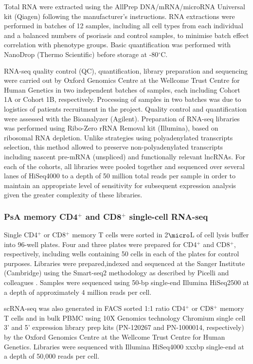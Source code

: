 Total RNA were extracted using the AllPrep DNA/mRNA/microRNA Universal kit (Qiagen) following the manufacturer's instructions. RNA extractions were performed in batches of 12 samples, including all cell types from each individual and a balanced numbers of psoriasis and control samples, to minimise batch effect correlation with phenotype groups. Basic quantification was performed with NanoDrop (Thermo Scientific) before storage at -80{$^\circ$}C.

RNA-seq quality control (QC), quantification, library preparation and sequencing were carried out by Oxford Genomics Centre at the Wellcome Trust Centre for Human Genetics in two independent batches of samples, each including Cohort 1A or Cohort 1B, respectively. Processing of samples in two batches was due to logistics of patients recruitment in the project. Quality control and quantification were assessed with the Bioanalyzer (Agilent). Preparation of RNA-seq libraries was performed using Ribo-Zero rRNA Removal kit (Illumina), based on ribosomal RNA depletion. Unlike strategies using polyadenylated transcripts selection, this method allowed to preserve non-polyadenylated transcripts including nascent pre-mRNA (unspliced) and functionally relevant lncRNAs. For each of the cohorts, all libraries were pooled together and  sequenced over several lanes of HiSeq4000 to a depth of 50 million total reads per sample in order to maintain an appropriate level of sensitivity for subsequent expression analysis given the greater complexity of these libraries.

 

\subsubsection{PsA memory CD4$^{+}$ and CD8$^{+}$ single-cell RNA-seq} 
\label{scRNA_processing}
Single CD4$^{+}$ or CD8$^{+}$ memory T cells were sorted in 2$\micro$L of cell lysis buffer into 96-well plates. Four and three plates were prepared for CD4$^{+}$ and CD8$^{+}$, respectively, including wells containing 50 cells in each of the plates for control purposes. Libraries were prepared,indexed and sequenced at the Sanger Institute (Cambridge) using the Smart-seq2 methodology as described by Picelli and colleagues \parencite{Picelli2014}. Samples were sequenced using 50-bp single-end Illumina HiSeq2500 at a depth of approximately 4 million reads per cell. %

scRNA-seq was also generated in FACS sorted 1:1 ratio CD4$^{+}$ or CD8$^{+}$ memory T cells and in bulk PBMC using 10X Genomics technology Chromium single cell 3' and 5' expression library prep kits (PN-120267 and PN-1000014, respectively) by the Oxford Genomics Centre at the Wellcome Trust Centre for Human Genetics. Libraries were sequenced with Illumina HiSeq4000 xxxbp single-end at a depth of 50,000 reads per cell.

